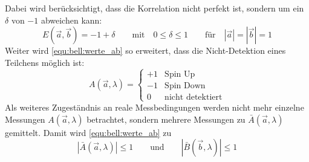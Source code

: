 \begin{refsection}
Dabei wird ber\"ucksichtigt, dass die Korrelation nicht perfekt ist, sondern
um ein $\delta$ von $-1$ abweichen kann:
\begin{equation}
    E(\vec{a},\vec{b}) = -1 + \delta 
    \qquad \text{mit} \quad  0 \leq \delta \leq 1     
    \qquad \text{f\"ur} \quad |\vec{a}| = |\vec{b}| = 1
\end{equation}
Weiter wird \eqref{equ:bell:werte_ab} so erweitert, dass die Nicht-Detektion
eines Teilchens m\"oglich ist:
\begin{equation}
    A(\vec{a},\lambda) = \begin{cases}
        +1 & \text{Spin Up} \\
        -1 & \text{Spin Down} \\
        0 & \text{nicht detektiert}
    \end{cases}
\end{equation}
Als weiteres Zugest\"andnis an reale Messbedingungen werden nicht mehr einzelne
Messungen $A(\vec{a},\lambda)$ betrachtet, sondern mehrere Messungen zu
$\bar{A}(\vec{a},\lambda)$ gemittelt.
Damit wird \eqref{equ:bell:werte_ab} zu
\begin{equation*}
    \left| \bar{A}(\vec{a},\lambda) \right| \leq 1
    \qquad \text{und} \qquad 
    \left| \bar{B}(\vec{b},\lambda) \right| \leq 1
\end{equation*}


\end{refsection}
